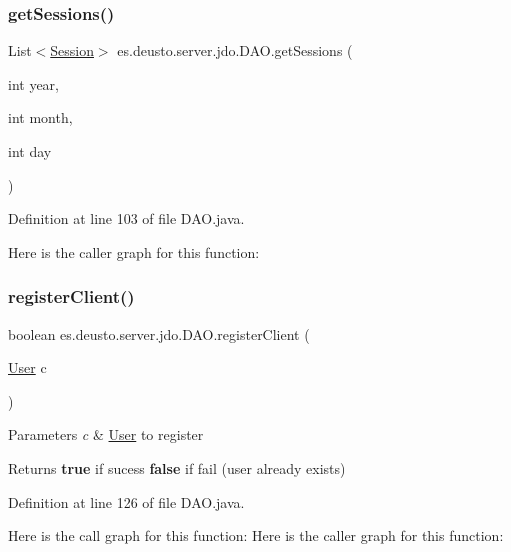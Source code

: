 \subsubsection{\texorpdfstring{getSessions()}{getSessions()}}
{\footnotesize\ttfamily List$<$\mbox{\hyperlink{classes_1_1deusto_1_1server_1_1jdo_1_1_session}{Session}}$>$ es.\+deusto.\+server.\+jdo.\+D\+A\+O.\+get\+Sessions (\begin{DoxyParamCaption}\item[{int}]{year,  }\item[{int}]{month,  }\item[{int}]{day }\end{DoxyParamCaption})}



Definition at line 103 of file D\+A\+O.\+java.

Here is the caller graph for this function\+:
\mbox{\label{classes_1_1deusto_1_1server_1_1jdo_1_1_d_a_o_a783758c37658336ee1e4e995a672a0ce}} 
\subsubsection{\texorpdfstring{registerClient()}{registerClient()}}
{\footnotesize\ttfamily boolean es.\+deusto.\+server.\+jdo.\+D\+A\+O.\+register\+Client (\begin{DoxyParamCaption}\item[{\mbox{\hyperlink{classes_1_1deusto_1_1server_1_1jdo_1_1_user}{User}}}]{c }\end{DoxyParamCaption})}


\begin{DoxyParams}{Parameters}
{\em c} & \mbox{\hyperlink{classes_1_1deusto_1_1server_1_1jdo_1_1_user}{User}} to register \\
\hline
\end{DoxyParams}
\begin{DoxyReturn}{Returns}
{\bfseries{true}} if sucess {\bfseries{false}} if fail (user already exists) 
\end{DoxyReturn}


Definition at line 126 of file D\+A\+O.\+java.

Here is the call graph for this function\+:
Here is the caller graph for this function\+:
\mbox{\label{classes_1_1deusto_1_1server_1_1jdo_1_1_d_a_o_ac2a137746dce274ba0a89eb388820bcf}} 
